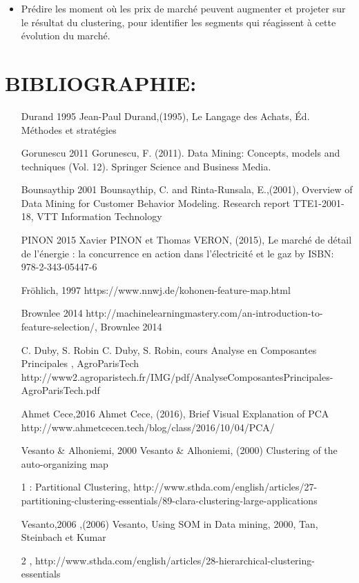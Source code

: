 \documentclass[12pt]{article}
\begin{document}
{\begin{itemize}
\item Prédire les moment où les prix de marché peuvent augmenter et projeter sur le résultat du clustering, pour identifier les segments qui réagissent à cette évolution du marché.

\end{itemize}

\newpage
\section{BIBLIOGRAPHIE:}
\begin{itemize}
    \item [Durand 1995] Jean-Paul Durand,(1995), Le Langage des Achats, Éd. Méthodes et stratégies
    \item [Gorunescu 2011] Gorunescu, F. (2011). Data Mining: Concepts, models and techniques (Vol. 12). Springer Science and Business Media.
    \item [Bounsaythip 2001] Bounsaythip, C. and Rinta-Runsala, E.,(2001), Overview of Data Mining for Customer Behavior Modeling. Research report TTE1-2001-18, VTT Information Technology 
    \item [PINON 2015] Xavier PINON et Thomas VERON, (2015), Le marché de détail de l’énergie : la concurrence en action dans l’électricité et le gaz by ISBN: 978-2-343-05447-6
    \item [Fröhlich, 1997] https://www.nnwj.de/kohonen-feature-map.html
    \item [Brownlee 2014] http://machinelearningmastery.com/an-introduction-to-feature-selection/, Brownlee 2014
    \item [C. Duby, S. Robin] C. Duby, S. Robin, cours Analyse en Composantes Principales , AgroParisTech http://www2.agroparistech.fr/IMG/pdf/AnalyseComposantesPrincipales-AgroParisTech.pdf
     \item [Ahmet Cece,2016] Ahmet Cece, (2016), Brief Visual Explanation of PCA http://www.ahmetcecen.tech/blog/class/2016/10/04/PCA/
     \item [Vesanto \& Alhoniemi, 2000] Vesanto \& Alhoniemi, (2000) Clustering of the auto-organizing map
    \item [1]: Partitional Clustering, http://www.sthda.com/english/articles/27-partitioning-clustering-essentials/89-clara-clustering-large-applications
    \item [Vesanto,2006],(2006) Vesanto, Using SOM in Data mining, 2000, Tan, Steinbach et Kumar
    \item [2], http://www.sthda.com/english/articles/28-hierarchical-clustering-essentials

\end{itemize}}
\end{document}
